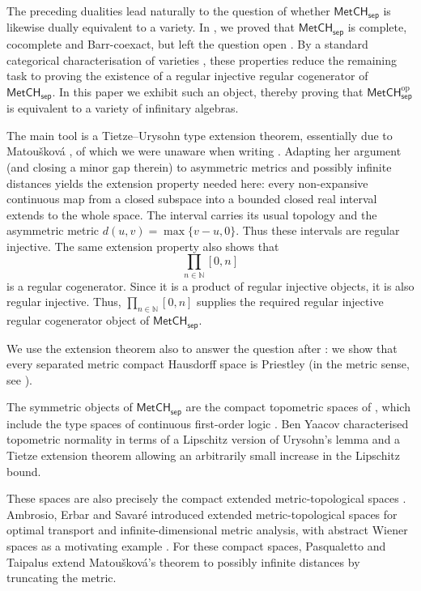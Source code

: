 \documentclass[11pt]{amsart}
\theoremstyle{definition}
\newcommand{\cat}[1]{\mathsf{#1}}
\newcommand{\op}{\mathrm{op}}
\newcommand{\MetCHsep}{\cat{MetCH_{sep}}}
\newcommand{\MetCHsepop}{\cat{MetCH}_\cat{sep}^\op}
\newcommand{\N}{\mathbb{N}}
\begin{document}
The preceding dualities lead naturally to the question of whether $\MetCHsep$ is likewise dually equivalent to a variety. In \cite{AH25}, we proved that $\MetCHsep$ is complete, cocomplete and Barr-coexact, but left the question open \cite[Question 5.18]{AH25}. By a standard categorical characterisation of varieties \cite[Thm.~4.4.5]{Bor94a}, these properties reduce the remaining task to proving the existence of a regular injective regular cogenerator of $\MetCHsep$. In this paper we exhibit such an object, thereby proving that $\MetCHsepop$ is equivalent to a variety of infinitary algebras.

The main tool is a Tietze--Urysohn type extension theorem, essentially due to Matou\v{s}kov\'a \cite[Thm.~2.4]{Mat00}, of which we were unaware when writing \cite{AH25}. Adapting her argument (and closing a minor gap therein) to asymmetric metrics and possibly infinite distances yields the extension property needed here: every non-expansive continuous map from a closed subspace into a bounded closed real interval extends to the whole space. The interval carries its usual topology and the asymmetric metric $d(u,v)=\max\{v-u,0\}$. Thus these intervals are regular injective. The same extension property also shows that
\[
  \prod_{n\in\N}[0,n]
\]
is a regular cogenerator. Since it is a product of regular injective objects, it is also regular injective. Thus, $\prod_{n\in\N}[0,n]$ supplies the required regular injective regular cogenerator object of $\MetCHsep$.

We use the extension theorem also to answer the question after \cite[Cor.~2.22]{HN23}: we show that every separated metric compact Hausdorff space is Priestley (in the metric sense, see \cite[Def.~2.18]{HN23}).

The symmetric objects of $\MetCHsep$ are the compact topometric spaces of \cite{BenYaacov2008,BenYaacov2013}, which include the type spaces of continuous first-order logic \cite{BenYaacovUsvyatsov2010}. Ben Yaacov \cite[Thms.~1.6 and~1.9]{BenYaacov2013} characterised topometric normality in terms of a Lipschitz version of Urysohn's lemma and a Tietze extension theorem allowing an arbitrarily small increase in the Lipschitz bound.

These spaces are also precisely the compact extended metric-topological spaces \cite[Rem.~3.2]{PST26}. Ambrosio, Erbar and Savar\'e introduced extended metric-topological spaces for optimal transport and infinite-dimensional metric analysis, with abstract Wiener spaces as a motivating example \cite{AES16}. For these compact spaces, Pasqualetto and Taipalus \cite[Thm.~3.1 and Rem.~3.2(i)]{PT26} extend Matou\v{s}kov\'a's theorem to possibly infinite distances by truncating the metric.
\end{document}
